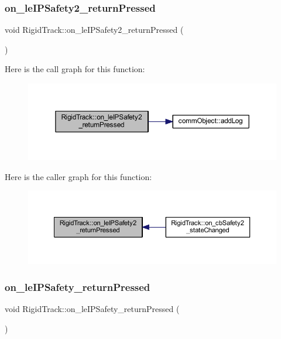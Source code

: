 \subsubsection{on\+\_\+le\+I\+P\+Safety2\+\_\+return\+Pressed}
{\footnotesize\ttfamily void Rigid\+Track\+::on\+\_\+le\+I\+P\+Safety2\+\_\+return\+Pressed (\begin{DoxyParamCaption}{ }\end{DoxyParamCaption})\hspace{0.3cm}{\ttfamily [slot]}}

Here is the call graph for this function\+:\nopagebreak
\begin{figure}[H]
\begin{center}
\leavevmode
\includegraphics[width=350pt]{class_rigid_track_a555c536593d659b940de43cd2db8d6c1_cgraph}
\end{center}
\end{figure}
Here is the caller graph for this function\+:\nopagebreak
\begin{figure}[H]
\begin{center}
\leavevmode
\includegraphics[width=350pt]{class_rigid_track_a555c536593d659b940de43cd2db8d6c1_icgraph}
\end{center}
\end{figure}
\mbox{\label{class_rigid_track_aa527ab3a2ddc7b31bf1063260efc9755}} 
\subsubsection{on\+\_\+le\+I\+P\+Safety\+\_\+return\+Pressed}
{\footnotesize\ttfamily void Rigid\+Track\+::on\+\_\+le\+I\+P\+Safety\+\_\+return\+Pressed (\begin{DoxyParamCaption}{ }\end{DoxyParamCaption})\hspace{0.3cm}{\ttfamily [slot]}}


